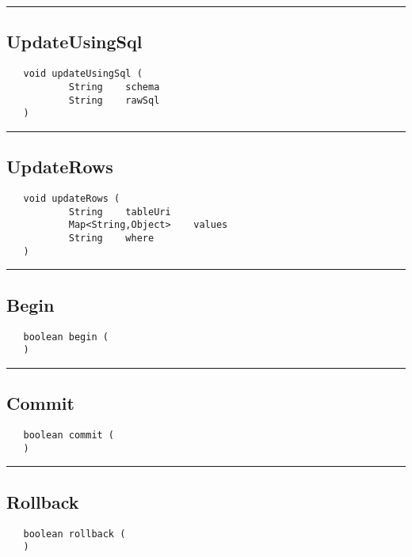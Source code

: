 \rule{15cm}{2pt}
\subsection{UpdateUsingSql}
\label{Api:UpdateUsingSql}
\begin{verbatim}
   void updateUsingSql (
           String    schema
           String    rawSql
   )
\end{verbatim}



\rule{15cm}{2pt}
\subsection{UpdateRows}
\label{Api:UpdateRows}
\begin{verbatim}
   void updateRows (
           String    tableUri
           Map<String,Object>    values
           String    where
   )
\end{verbatim}



\rule{15cm}{2pt}
\subsection{Begin}
\label{Api:Begin}
\begin{verbatim}
   boolean begin (
   )
\end{verbatim}



\rule{15cm}{2pt}
\subsection{Commit}
\label{Api:Commit}
\begin{verbatim}
   boolean commit (
   )
\end{verbatim}



\rule{15cm}{2pt}
\subsection{Rollback}
\label{Api:Rollback}
\begin{verbatim}
   boolean rollback (
   )
\end{verbatim}



